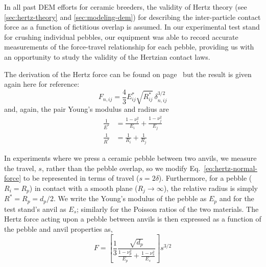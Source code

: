 




In all past DEM efforts for ceramic breeders, the validity of Hertz theory (see \cref{sec:hertz-theory} and \cref{sec:modeling-dem}) for describing the inter-particle contact force as a function of fictitious overlap is assumed. In our experimental test stand for crushing individual pebbles, our equipment was able to record accurate measurements of the force-travel relationship for each pebble, providing us with an opportunity to study the validity of the Hertzian contact laws. 

The derivation of the Hertz force can be found on page~\pageref{eq:hertz-normal-force} but the result is given again here for reference:
\begin{equation*}
  F_{n,ij} = \frac{4}{3}E_{ij}^* \sqrt{R_{ij}^*} \, \delta_{n,ij}^{3/2}
\end{equation*}
and, again, the pair Young's modulus and radius are
\begin{align*}
\frac{1}{E^*} & = \frac{1-\nu_i^2}{E_i} + \frac{1-\nu_j^2}{E_j} \\
\frac{1}{R^*} & = \frac{1}{R_i} + \frac{1}{R_j}
\end{align*}

In experiments where we press a ceramic pebble between two anvils, we measure the travel, $s$, rather than the pebble overlap, so we modify Eq.~\ref{eq:hertz-normal-force} to be represented in terms of travel ($s = 2\delta$). Furthermore, for a pebble ($R_i = R_p$) in contact with a smooth plane ($R_j \rightarrow \infty$), the relative radius is simply $R^* = R_p = d_p/2$. We write the Young's modulus of the pebble as $E_p$ and for the test stand's anvil as $E_s$; similarly for the Poisson ratios of the two materials. The Hertz force acting upon a pebble between anvils is then expressed as a function of the pebble and anvil properties as,
\begin{equation}\label{eq:contact-force}
        F = \left[\frac{1}{3}\frac{\sqrt{d_p}}{\frac{1-\nu_p^2}{E_p} + \frac{1-\nu_s^2}{E_s}}\right] s^{3/2}
\end{equation}


